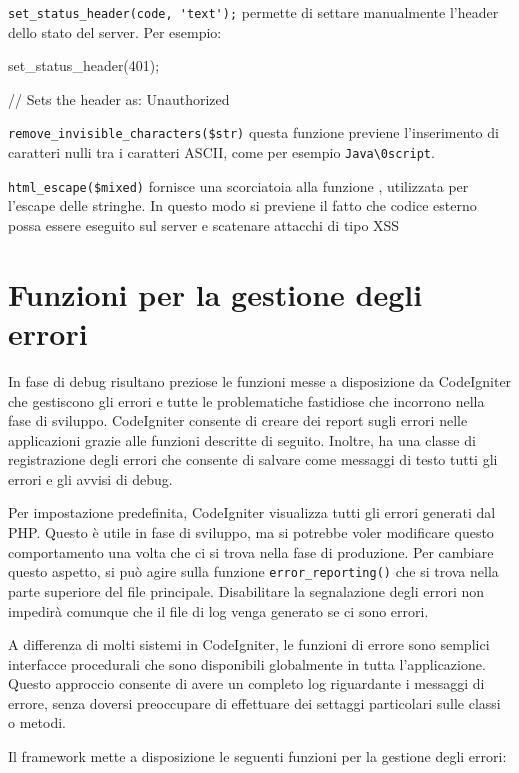 \verb|set_status_header(code, 'text');| permette di settare manualmente l'header dello stato del server. Per esempio:

\begin{code}
set_status_header(401);

// Sets the header as: Unauthorized
\end{code}

\verb|remove_invisible_characters($str)| questa funzione previene l'inserimento di caratteri nulli tra i caratteri ASCII, come per esempio \verb|Java\0script|.

\verb|html_escape($mixed)| fornisce una scorciatoia alla funzione , utilizzata per l'escape delle stringhe. In questo modo si previene il fatto che codice esterno possa essere eseguito sul server e scatenare attacchi di tipo \ac{XSS}

\section{Funzioni per la gestione degli errori}
In fase di debug risultano preziose le funzioni messe a disposizione da CodeIgniter che gestiscono gli errori e tutte le problematiche fastidiose che incorrono nella fase di sviluppo. CodeIgniter consente di creare dei report sugli errori nelle applicazioni grazie alle funzioni descritte di seguito. Inoltre, ha una classe di registrazione degli errori che consente di salvare come messaggi di testo tutti gli errori e gli avvisi di debug.

Per impostazione predefinita, CodeIgniter visualizza tutti gli errori generati dal PHP. Questo è utile in fase di sviluppo, ma si potrebbe voler modificare questo comportamento una volta che ci si trova nella fase di produzione. Per cambiare questo aspetto, si può agire sulla funzione \verb|error_reporting()| che si trova nella parte superiore del file  principale. Disabilitare la segnalazione degli errori non impedirà comunque che il file di log venga generato se ci sono errori. 

A differenza di molti sistemi in CodeIgniter, le funzioni di errore sono semplici interfacce procedurali che sono disponibili globalmente in tutta l'applicazione. Questo approccio consente di avere un completo log riguardante i messaggi di errore, senza doversi preoccupare di effettuare dei settaggi particolari sulle classi o metodi.

Il framework mette a disposizione le seguenti funzioni per la gestione degli errori:

